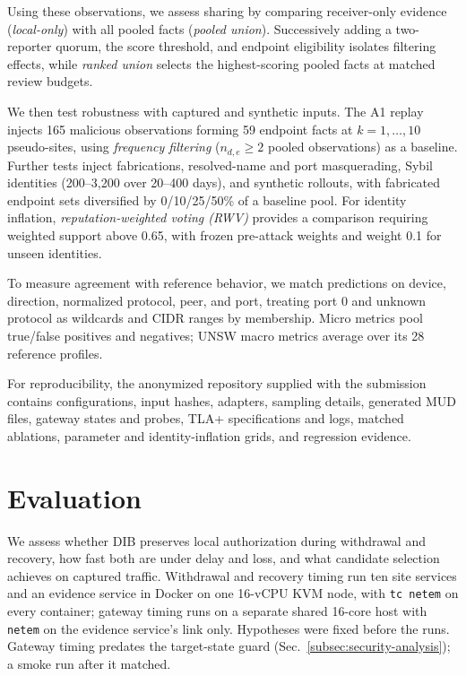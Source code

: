 \documentclass[journal]{IEEEtran}
\theoremstyle{definition}
\begin{document}
Using these observations, we assess sharing by comparing receiver-only evidence (\emph{local-only}) with all pooled facts (\emph{pooled union}). Successively adding a two-reporter quorum, the score threshold, and endpoint eligibility isolates filtering effects, while \emph{ranked union} selects the highest-scoring pooled facts at matched review budgets.

We then test robustness with captured and synthetic inputs. The A1 replay injects 165 malicious observations forming 59 endpoint facts at $k=1,\ldots,10$ pseudo-sites, using \emph{frequency filtering} ($n_{d,e}\ge2$ pooled observations) as a baseline. Further tests inject fabrications, resolved-name and port masquerading, Sybil identities (200--3,200 over 20--400 days), and synthetic rollouts, with fabricated endpoint sets diversified by 0/10/25/50\% of a baseline pool. For identity inflation, \emph{reputation-weighted voting (RWV)} provides a comparison requiring weighted support above 0.65, with frozen pre-attack weights and weight 0.1 for unseen identities.

To measure agreement with reference behavior, we match predictions on device, direction, normalized protocol, peer, and port, treating port 0 and unknown protocol as wildcards and CIDR ranges by membership. Micro metrics pool true/false positives and negatives; UNSW macro metrics average over its 28 reference profiles.



For reproducibility, the anonymized repository supplied with the submission contains configurations, input hashes, adapters, sampling details, generated MUD files, gateway states and probes, TLA+ specifications and logs, matched ablations, parameter and identity-inflation grids, and regression evidence. 

\section{Evaluation}
\label{sec:eval}
We assess whether DIB preserves local authorization during withdrawal and recovery, how fast both are under delay and loss, and what candidate selection achieves on captured traffic. Withdrawal and recovery timing run ten site services and an evidence service in Docker on one 16-vCPU KVM node, with \texttt{tc netem} on every container; gateway timing runs on a separate shared 16-core host with \texttt{netem} on the evidence service's link only. Hypotheses were fixed before the runs. Gateway timing predates the target-state guard (Sec.~\ref{subsec:security-analysis}); a smoke run after it matched.
\end{document}

